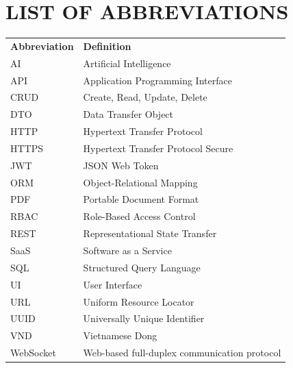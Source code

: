 \chapter*{LIST OF ABBREVIATIONS}

\begin{longtable}{@{}ll@{}}
\textbf{Abbreviation} & \textbf{Definition} \\
AI & Artificial Intelligence \\
API & Application Programming Interface \\
CRUD & Create, Read, Update, Delete \\
DTO & Data Transfer Object \\
HTTP & Hypertext Transfer Protocol \\
HTTPS & Hypertext Transfer Protocol Secure \\
JWT & JSON Web Token \\
ORM & Object-Relational Mapping \\
PDF & Portable Document Format \\
RBAC & Role-Based Access Control \\
REST & Representational State Transfer \\
SaaS & Software as a Service \\
SQL & Structured Query Language \\
UI & User Interface \\
URL & Uniform Resource Locator \\
UUID & Universally Unique Identifier \\
VND & Vietnamese Dong \\
WebSocket & Web-based full-duplex communication protocol \\
\end{longtable}

